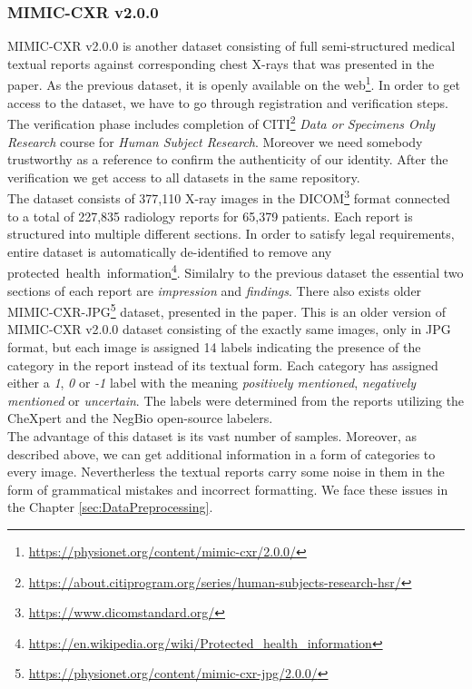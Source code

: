 \subsubsection{MIMIC-CXR v2.0.0}
MIMIC-CXR v2.0.0 is another dataset consisting of full semi-structured medical textual reports against corresponding chest X-rays that was presented in the \citet{cxr:johnson2019mimic} paper. As the previous dataset, it is openly available on the web\footnote[9]{\url{https://physionet.org/content/mimic-cxr/2.0.0/}}. In order to get access to the dataset, we have to go through registration and verification steps. The verification phase includes completion of CITI\footnote[10]{\url{https://about.citiprogram.org/series/human-subjects-research-hsr/}} \textit{Data or Specimens Only Research} course for \textit{Human Subject Research}. Moreover we need somebody trustworthy as a reference to confirm the authenticity of our identity. After the verification we get access to all datasets in the same repository.\\

The dataset consists of 377,110 X-ray images in the DICOM\footnote[11]{\url{https://www.dicomstandard.org/}} format connected to a total of 227,835 radiology reports for 65,379 patients. Each report is structured into multiple different sections. In order to satisfy legal requirements, entire dataset is automatically de-identified to remove any protected~health~information\footnote[12]{\url{https://en.wikipedia.org/wiki/Protected\_health\_information}}. Similalry to the previous dataset the essential two sections of each report are \textit{impression} and \textit{findings}. There also exists older MIMIC-CXR-JPG\footnote[13]{\url{https://physionet.org/content/mimic-cxr-jpg/2.0.0/}} dataset, presented in the \citet{cxr-jpg:johnson2019mimic} paper. This is an older version of MIMIC-CXR v2.0.0 dataset consisting of the exactly same images, only in JPG format, but each image is assigned 14 labels indicating the presence of the category in the report instead of its textual form. Each category has assigned either a \textit{1}, \textit{0} or \textit{-1} label with the meaning \textit{positively mentioned}, \textit{negatively mentioned} or \textit{uncertain}. The labels were determined from the reports utilizing the CheXpert\citep{irvin2019chexpert} and the NegBio\citep{peng2018negbio} open-source labelers.\\

The advantage of this dataset is its vast number of samples. Moreover, as described above, we can get additional information in a form of categories to every image. Nevertherless the textual reports carry some noise in them in the form of grammatical mistakes and incorrect formatting. We face these issues in the Chapter \ref{sec:DataPreprocessing}. 

